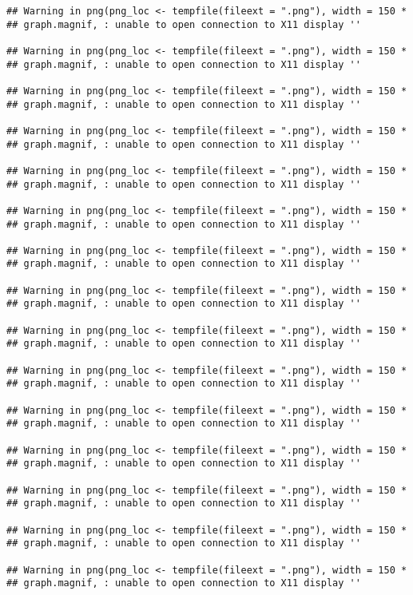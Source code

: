\documentclass[]{article}
\begin{document}
\begin{verbatim}
## Warning in png(png_loc <- tempfile(fileext = ".png"), width = 150 *
## graph.magnif, : unable to open connection to X11 display ''

## Warning in png(png_loc <- tempfile(fileext = ".png"), width = 150 *
## graph.magnif, : unable to open connection to X11 display ''

## Warning in png(png_loc <- tempfile(fileext = ".png"), width = 150 *
## graph.magnif, : unable to open connection to X11 display ''

## Warning in png(png_loc <- tempfile(fileext = ".png"), width = 150 *
## graph.magnif, : unable to open connection to X11 display ''

## Warning in png(png_loc <- tempfile(fileext = ".png"), width = 150 *
## graph.magnif, : unable to open connection to X11 display ''

## Warning in png(png_loc <- tempfile(fileext = ".png"), width = 150 *
## graph.magnif, : unable to open connection to X11 display ''

## Warning in png(png_loc <- tempfile(fileext = ".png"), width = 150 *
## graph.magnif, : unable to open connection to X11 display ''

## Warning in png(png_loc <- tempfile(fileext = ".png"), width = 150 *
## graph.magnif, : unable to open connection to X11 display ''

## Warning in png(png_loc <- tempfile(fileext = ".png"), width = 150 *
## graph.magnif, : unable to open connection to X11 display ''

## Warning in png(png_loc <- tempfile(fileext = ".png"), width = 150 *
## graph.magnif, : unable to open connection to X11 display ''

## Warning in png(png_loc <- tempfile(fileext = ".png"), width = 150 *
## graph.magnif, : unable to open connection to X11 display ''

## Warning in png(png_loc <- tempfile(fileext = ".png"), width = 150 *
## graph.magnif, : unable to open connection to X11 display ''

## Warning in png(png_loc <- tempfile(fileext = ".png"), width = 150 *
## graph.magnif, : unable to open connection to X11 display ''

## Warning in png(png_loc <- tempfile(fileext = ".png"), width = 150 *
## graph.magnif, : unable to open connection to X11 display ''

## Warning in png(png_loc <- tempfile(fileext = ".png"), width = 150 *
## graph.magnif, : unable to open connection to X11 display ''


\end{verbatim}
\end{document}
